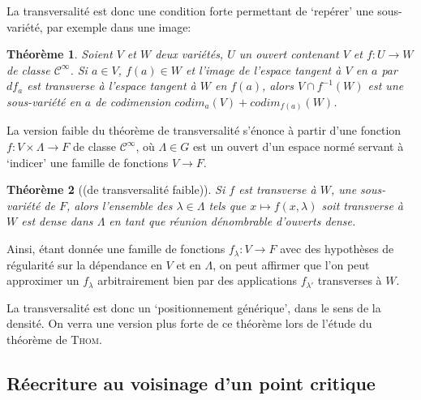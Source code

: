 \documentclass{article}
\newcommand{\cinf}{\mathcal{C}^\infty}
\newtheorem{thm}{Théorème}
\theoremstyle{definition}
\newtheorem{defn}{Définition}
\begin{document}
La transversalité est donc une condition forte permettant de `repérer' une sous-variété, par exemple dans une image:

\begin{thm}
	Soient $V$ et $W$ deux variétés, $U$ un ouvert contenant $V$ et $f:U\to W$ de classe $\cinf$.
	Si $a\in V$, $f(a)\in W$ et l'image de l'espace tangent à $V$ en $a$ par $df_a$ est transverse à l'espace tangent à $W$ en $f(a)$, alors $V\cap f^{-1}(W)$ est une sous-variété en $a$ de codimension $codim_a(V)+codim_{f(a)}(W)$.
\end{thm}

\iffalse
\begin{defn}
	Une application $f$ est dite \textbf{structurellement stable} si pour toute application $p$ suffisament proche de 0 (et infiniment continue), $f+p$ a le même type de point critique que $f$ à translation près.
\end{defn}

Un point critique est en fait structurellement stable si et seulement si il est non dégénéré.
La \textbf{stabilité structurelle} signifie plus généralement que le comportement qualitatif ne change pas malgré une perturbation suffisament petite.
\fi

La version faible du théorème de transversalité s'énonce à partir d'une fonction $f: V\times\Lambda\to F$ de classe $\cinf$, où $\Lambda\in G$ est un ouvert d'un espace normé servant à `indicer' une famille de fonctions $V\to F$.

\begin{thm}[(de transversalité faible)]
	Si $f$ est transverse à $W$, une sous-variété de $F$, alors l'ensemble des $\lambda\in\Lambda$ tels que $x\mapsto f(x,\lambda)$ soit transverse à $W$ est dense dans $\Lambda$ en tant que réunion dénombrable d'ouverts dense.
\end{thm}

Ainsi, étant donnée une famille de fonctions $f_\lambda: V\to F$ avec des hypothèses de régularité sur la dépendance en $V$ et en $\Lambda$, on peut affirmer que l'on peut approximer un $f_\lambda$ arbitrairement bien par des applications $f_{\lambda'}$ transverses à $W$.

La transversalité est donc un `positionnement générique', dans le sens de la densité. On verra une version plus forte de ce théorème lors de l'étude du théorème de \textsc{Thom}.

\subsection{Réecriture au voisinage d'un point critique}
\end{document}
